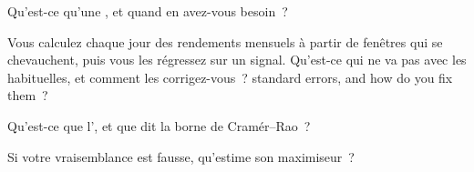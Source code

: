 \begin{interviewq}\label{iq:qm:estimation:3}
Qu'est-ce qu'une , et quand en avez-vous besoin~?
\end{interviewq}

\begin{interviewq}\label{iq:qm:estimation:4}
Vous calculez chaque jour des rendements mensuels à partir de fenêtres qui se chevauchent, puis vous les régressez sur un signal. Qu'est-ce qui ne va pas avec les  habituelles, et comment les corrigez-vous~?
standard errors, and how do you fix them~?
\end{interviewq}

\begin{interviewq}\label{iq:qm:estimation:5}
Qu'est-ce que l', et que dit la borne de Cramér--Rao~?
\end{interviewq}

\begin{interviewq}\label{iq:qm:estimation:6}
Si votre vraisemblance est fausse, qu'estime son maximiseur~?
\end{interviewq}
